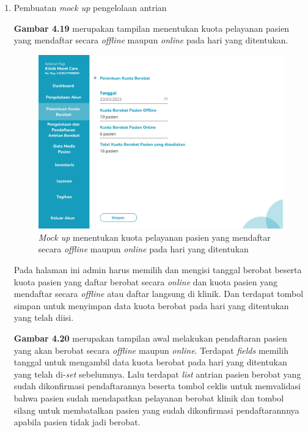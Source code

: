 \begin{enumerate}
	\item Pembuatan \emph{mock up} pengelolaan antrian
	
	\textbf{Gambar 4.19} merupakan tampilan menentukan kuota pelayanan pasien yang mendaftar secara \emph{offline} maupun \emph{online} pada hari yang ditentukan.
	
	\begin{figure}[H]
		\centering
		\includegraphics[width=12cm]{gambar/mockup_web/Pengelolaan Antrian Akun 1.png}
		\caption{\emph{Mock up} menentukan kuota pelayanan pasien yang mendaftar secara \emph{offline} maupun \emph{online} pada hari yang ditentukan}
		\label{Gambar:pengelolaanantrian1}
	\end{figure}
	
	Pada halaman ini admin harus memilih dan mengisi tanggal berobat beserta kuota pasien yang daftar berobat secara \emph{online} dan kuota pasien yang mendaftar secara \emph{offline} atau daftar langsung di klinik. Dan terdapat tombol simpan untuk menyimpan data kuota berobat pada hari yang ditentukan yang telah diisi.
	
	\textbf{Gambar 4.20} merupakan tampilan awal melakukan pendaftaran pasien yang akan berobat secara \emph{offline} maupun \emph{online}. Terdapat \emph{fields} memilih tanggal untuk mengambil data kuota berobat pada hari yang ditentukan yang telah di-\emph{set} sebelumnya. Lalu terdapat \emph{list} antrian pasien berobat yang sudah dikonfirmasi pendaftarannya beserta tombol ceklis untuk memvalidasi bahwa pasien sudah mendapatkan pelayanan berobat klinik dan tombol silang untuk membatalkan pasien yang sudah dikonfirmasi pendaftarannnya apabila pasien tidak jadi berobat. 
	

\end{enumerate}
